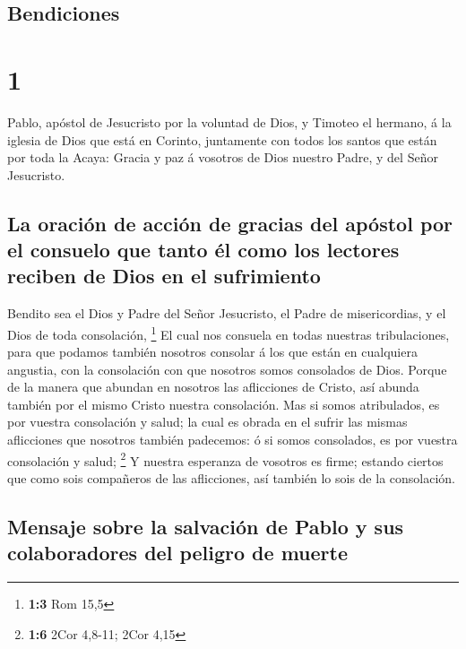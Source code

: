 \hypertarget{bendiciones}{%
\subsection{Bendiciones}\label{bendiciones}}

\hypertarget{section}{%
\section{1}\label{section}}

 Pablo, apóstol de Jesucristo por la voluntad de Dios, y
Timoteo el hermano, á la iglesia de Dios que está en Corinto, juntamente
con todos los santos que están por toda la Acaya:  Gracia
y paz á vosotros de Dios nuestro Padre, y del Señor Jesucristo.

\hypertarget{la-oraciuxf3n-de-acciuxf3n-de-gracias-del-apuxf3stol-por-el-consuelo-que-tanto-uxe9l-como-los-lectores-reciben-de-dios-en-el-sufrimiento}{%
\subsection{La oración de acción de gracias del apóstol por el consuelo
que tanto él como los lectores reciben de Dios en el
sufrimiento}\label{la-oraciuxf3n-de-acciuxf3n-de-gracias-del-apuxf3stol-por-el-consuelo-que-tanto-uxe9l-como-los-lectores-reciben-de-dios-en-el-sufrimiento}}

 Bendito sea el Dios y Padre del Señor Jesucristo, el
Padre de misericordias, y el Dios de toda consolación, \footnote{\textbf{1:3}
  Rom 15,5}  El cual nos consuela en todas nuestras
tribulaciones, para que podamos también nosotros consolar á los que
están en cualquiera angustia, con la consolación con que nosotros somos
consolados de Dios.  Porque de la manera que abundan en
nosotros las aflicciones de Cristo, así abunda también por el mismo
Cristo nuestra consolación.  Mas si somos atribulados, es
por vuestra consolación y salud; la cual es obrada en el sufrir las
mismas aflicciones que nosotros también padecemos: ó si somos
consolados, es por vuestra consolación y salud; \footnote{\textbf{1:6}
  2Cor 4,8-11; 2Cor 4,15}  Y nuestra esperanza de vosotros
es firme; estando ciertos que como sois compañeros de las aflicciones,
así también lo sois de la consolación.

\hypertarget{mensaje-sobre-la-salvaciuxf3n-de-pablo-y-sus-colaboradores-del-peligro-de-muerte}{%
\subsection{Mensaje sobre la salvación de Pablo y sus colaboradores del
peligro de
muerte}\label{mensaje-sobre-la-salvaciuxf3n-de-pablo-y-sus-colaboradores-del-peligro-de-muerte}}

